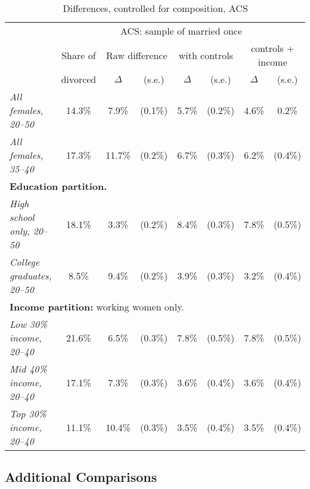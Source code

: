 \documentclass[12pt,letter]{article}
\begin{document}
\begin{table}
\begin{center}
\begin{tabular}{|l|c||c|c|c|c|c|c|}\cline{2-8}
\multicolumn{1}{c|}{} & \multicolumn{7}{c|}{ACS: sample of married once}\\\cline{2-8}
\multicolumn{1}{c|}{} & \small Share of &\multicolumn{2}{c|}{\small Raw difference} & \multicolumn{2}{c|}{\small with controls} & \multicolumn{2}{c|}{\small controls + income} \\ \cline{3-8}
\multicolumn{1}{c|}{} & \small divorced & $\Delta$ & (s.e.) & $\Delta$ & (s.e.) & $\Delta$ & (s.e.) \\  \hline
\textit{All females, 20--50} & 14.3\% &  7.9\% &   (0.1\%) &    5.7\%  &    (0.2\%) &     4.6\%   &   0.2\% \\
\textit{All females, 35--40} &  17.3\% &  11.7\%  &  (0.2\%) &   6.7\% &  (0.3\%) &     6.2\%  &   (0.4\%) \\\hline\hline
\multicolumn{8}{|p{0.9\linewidth}|}{\footnotesize \textbf{Education partition.}}\\\hline
\textit{High school only, 20--50} & 18.1\% &   3.3\%  &    (0.2\%) &   8.4\% &   (0.3\%)   &  7.8\%   &  (0.5\%) \\
\textit{College graduates, 20--50} & 8.5\% &   9.4\% &   (0.2\%) &   3.9\% &   (0.3\%) &   3.2\%   &  (0.4\%) \\\hline\hline
\multicolumn{8}{|p{0.9\linewidth}|}{\footnotesize \textbf{Income partition:} working women only.}\\\hline
\textit{Low 30\% income, 20--40} &  21.6\% &  6.5\% &    (0.3\%) &    7.8\% &  (0.5\%) &   7.8\%   &  (0.5\%) \\
\textit{Mid 40\% income, 20--40} &  17.1\% &  7.3\% &   (0.3\%) &    3.6\%   & (0.4\%) &   3.6\% &    (0.4\%) \\
\textit{Top 30\% income, 20--40} & 11.1\% &  10.4\% &  (0.3\%) &    3.5\% &   (0.4\%) & 3.5\% &  (0.4\%) \\
\hline
\end{tabular}
\caption{Differences, controlled for composition, ACS\label{diff-contr}}
\end{center}
\end{table}

\subsection{Additional Comparisons}
\end{document}
